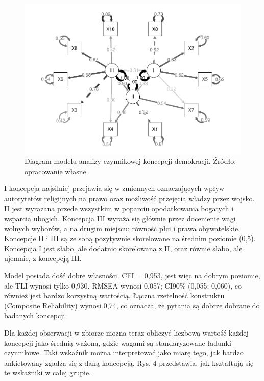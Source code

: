 \documentclass[12pt]{article}
\begin{document}
\begin{figure}

{\centering \includegraphics{text_ASA_files/figure-latex/diagram-all-1} 

}

\caption{Diagram modelu analizy czynnikowej koncepcji demokracji. Źródło: opracowanie własne.}\label{fig:diagram-all}
\end{figure}

I koncepcja najsilniej przejawia się w zmiennych oznaczających wpływ autorytetów religijnych na prawo oraz możliwość przejęcia władzy przez wojsko. II jest wyrażana przede wszystkim w poparciu opodatkowania bogatych i wsparcia ubogich. Koncepcja III wyraża się głównie przez docenienie wagi wolnych wyborów, a na drugim miejscu: równość płci i prawa obywatelskie. Koncepcje II i III są ze sobą pozytywnie skorelowane na średnim poziomie (0,5). Koncepcja I jest słabo, ale dodatnio skorelowana z II, oraz równie słabo, ale ujemnie, z koncepcją III.

Model posiada dość dobre własności. CFI = 0,953, jest więc na dobrym poziomie, ale TLI wynosi tylko 0,930. RMSEA wynosi 0,057; CI90\% (0,055; 0,060), co również jest bardzo korzystną wartością. Łączna rzetelność konstruktu (Composite Reliability) wynosi 0,74, co oznacza, że pytania są dobrze dobrane do badanych koncepcji.

Dla każdej obserwacji w zbiorze można teraz obliczyć liczbową wartość każdej koncepcji jako średnią ważoną, gdzie wagami są standaryzowane ładunki czynnikowe. Taki wskaźnik można interpretować jako miarę tego, jak bardzo ankietowany zgadza się z daną koncepcją. Rys. 4 przedstawia, jak kształtują się te wskaźniki w całej grupie.
\end{document}
